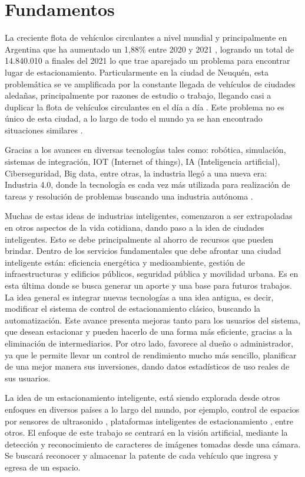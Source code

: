 \section{Fundamentos}

La creciente flota de vehículos circulantes a nivel mundial y principalmente en Argentina que ha aumentado un 1,88\% entre 2020 y 2021 \cite{asociacion_de_fabricas_argentinas_de_componentes_flota_2021}, logrando un total de 14.840.010 a finales del 2021 lo que trae aparejado un problema para encontrar lugar de estacionamiento.
Particularmente en la ciudad de Neuquén, esta problemática se ve amplificada por la constante llegada de vehículos de ciudades aledañas, principalmente por razones de estudio o trabajo, llegando casi a duplicar la flota de vehículos circulantes en el día a día \cite{calalesina_imposible_nodate}.
Este problema no es único de esta ciudad, a lo largo de todo el mundo ya se han encontrado situaciones similares \cite{20minutos_falta_2018, ibrahim_car_2017}.

Gracias a los avances  en diversas tecnologías tales como: robótica, simulación, sistemas de integración, IOT (Internet of things), IA (Inteligencia artificial), Ciberseguridad, Big data, entre otras, la industria llegó a una nueva era: Industria 4.0, donde la tecnología es cada vez más utilizada para realización de tareas y resolución de problemas buscando una industria autónoma \cite{basco_industria_2018}.

Muchas de estas ideas de industrias inteligentes, comenzaron a ser extrapoladas en otros aspectos de la vida cotidiana, dando paso a la idea de ciudades inteligentes.
Esto se debe principalmente al ahorro de recursos que pueden brindar. Dentro de los servicios fundamentales que debe afrontar una ciudad inteligente están: eficiencia energética y medioambiente, gestión de infraestructuras y edificios públicos, seguridad pública y movilidad urbana.
Es en esta última  donde se busca generar un aporte y una base para futuros trabajos. La idea general es integrar nuevas tecnologías a una idea antigua, es decir, modificar el sistema de control de estacionamiento clásico, buscando la automatización. Este avance presenta mejoras tanto para los usuarios del sistema, que desean estacionar y pueden hacerlo de una forma más eficiente, gracias a la eliminación de intermediarios.
Por otro lado, favorece al dueño o administrador, ya que le permite llevar un control de rendimiento mucho más sencillo, planificar de una mejor manera sus inversiones, dando datos estadísticos de uso reales de sus usuarios.

La idea de un estacionamiento inteligente, está siendo explorada desde otros enfoques en diversos países a lo largo del mundo, por ejemplo, control de espacios por sensores de ultrasonido \cite{rivera_arroyave_smartparkudea_2021}, plataformas inteligentes de estacionamiento \cite{formoso_parkit_2014}, entre otros.
El enfoque de este trabajo se centrará en la visión artificial, mediante la detección y reconocimiento de caracteres de imágenes tomadas desde una cámara. Se buscará reconocer y almacenar la patente de cada vehículo que ingresa y egresa de un espacio.
